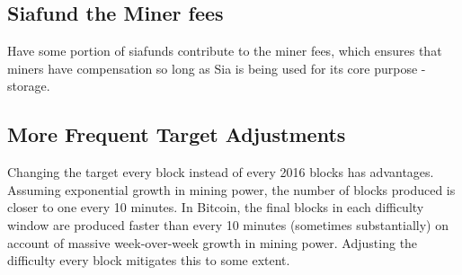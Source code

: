 \documentclass[twocolumn]{article}
\begin{document}

\subsection{Siafund the Miner fees}
Have some portion of siafunds contribute to the miner fees, which ensures that miners have compensation so long as Sia is being used for its core purpose - storage.



\subsection{More Frequent Target Adjustments}
Changing the target every block instead of every 2016 blocks has advantages.
Assuming exponential growth in mining power, the number of blocks produced is closer to one every 10 minutes.
In Bitcoin, the final blocks in each difficulty window are produced faster than every 10 minutes (sometimes substantially) on account of massive week-over-week growth in mining power.
Adjusting the difficulty every block mitigates this to some extent.
\end{document}

